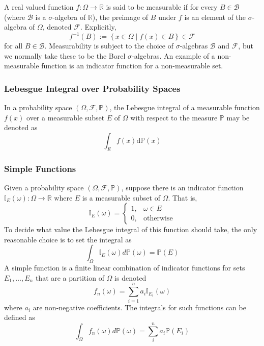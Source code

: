 \documentclass[11pt]{report} %
\begin{document}
A real valued function $f: \Omega \to \mathbb{R}$ is said to be measurable if for every $B\in\mathcal{B}$ (where $\mathcal{B}$ is a $\sigma$-algebra of $\mathbb{R}$), the preimage of $B$ under $f$ is an element of the $\sigma$-algebra of $\Omega$, denoted $\mathcal{F}$. Explicitly,
\begin{equation}
f^{-1}\left(B\right) := \left\{x \in \Omega \middle| f\left(x\right) \in B\right\} \in \mathcal{F}
\end{equation}
for all $B \in\mathcal{B}$. Measurability is subject to the choice of $\sigma$-algebras $\mathcal{B}$ and $\mathcal{F}$, but we normally take these to be the Borel $\sigma$-algebras. An example of a non-measurable function is an indicator function for a non-measurable set.

\subsubsection{Lebesgue Integral over Probability Spaces}

In a probability space $\left(\Omega, \mathcal{F}, \mathbb{P}\right)$, the Lebesgue integral of a measurable function $f\left(x\right)$ over a measurable subset $E$ of $\Omega$ with respect to the measure $\mathbb{P}$ may be denoted as
\begin{equation}
\int_{E}f\left(x\right)\mathrm{d}\mathbb{P}\left(x\right)
\end{equation}

\subsubsection{Simple Functions}

Given a probability space $\left(\Omega, \mathcal{F}, \mathbb{P}\right)$, suppose there is an indicator function $\mathbb{I}_{E}\left(\omega\right): \Omega \to \mathbb{R}$ where $E$ is a measurable subset of $\Omega$. That is,
\begin{equation}
\mathbb{I}_{E}\left(\omega\right) = \begin{cases} 1, & \omega \in E \\ 0, & \mathrm{otherwise}\end{cases}
\end{equation}
To decide what value the Lebesgue integral of this function should take, the only reasonable choice is to set the integral as
\begin{equation}
\int_{\Omega}\mathbb{I}_{E}\left(\omega\right)d\mathbb{P}\left(\omega\right) = \mathbb{P}\left(E\right)
\end{equation}
A simple function is a finite linear combination of indicator functions for sets $E_{1}, \dots, E_{n}$ that are a partition of $\Omega$ is denoted
\begin{equation}
f_{n}\left(\omega\right) = \sum_{i = 1}^{n}a_{i}\mathbb{I}_{E_{i}}\left(\omega\right)
\end{equation}
where $a_{i}$ are non-negative coefficients. The integrals for such functions can be defined as
\begin{equation}
\int_{\Omega}f_{n}\left(\omega\right)d\mathbb{P}\left(\omega\right) = \sum_{i}^{n}a_{i}\mathbb{P}\left(E_{i}\right)
\end{equation}
\end{document}
